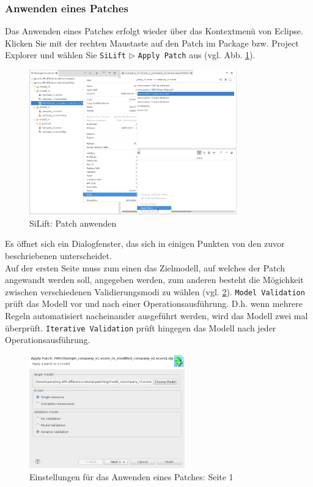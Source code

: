 \subsubsection{Anwenden eines Patches} \label{sec:patching_apply}

Das Anwenden eines Patches erfolgt wieder über das Kontextmenü von Eclipse.
Klicken Sie mit der rechten Maustaste auf den Patch im Package bzw. Project Explorer und wählen Sie \texttt{SiLift} $\triangleright$  \texttt{Apply Patch} aus (vgl. Abb. \ref{silift-tutorial_patching_contextmenu_apply}).

\begin{figure}[H]
\centering
\includegraphics[width=0.8\textwidth]{patching/graphics/silift-tutorial_patching_contextmenu_apply.png}
\caption{SiLift: Patch anwenden}
\label{silift-tutorial_patching_contextmenu_apply}
\end{figure}

Es öffnet sich ein Dialogfenster, das sich in einigen Punkten von den zuvor beschriebenen unterscheidet.\\
Auf der ersten Seite muss zum einen das Zielmodell, auf welches der Patch angewandt werden soll, angegeben werden, zum anderen besteht die Mögichkeit zwischen verschiedenen Validierungsmodi zu wählen (vgl. \ref{silift-tutorial_patching_apply_config_page01}).
\texttt{Model Validation} prüft das Modell vor und nach einer Operationsausführung.
D.h. wenn mehrere Regeln automatisiert nacheinander ausgeführt werden, wird das Modell zwei mal überprüft.
\texttt{Iterative Validation} prüft hingegen das Modell nach jeder Operationsausführung.

\begin{figure}[H]
\centering
\includegraphics[width=0.6\textwidth]{patching/graphics/silift-tutorial_patching_apply_config_page01.png}
\caption{Einstellungen für das Anwenden eines Patches: Seite 1}
\label{silift-tutorial_patching_apply_config_page01}
\end{figure}

